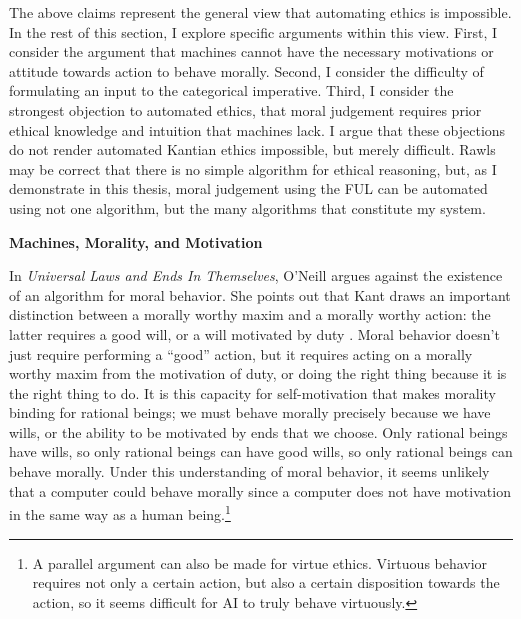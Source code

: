 \begin{isabellebody}
\begin{isamarkuptext}
The above claims represent the general view that automating ethics is impossible. In the
rest of this section, I explore specific arguments within this view. First, I consider the argument 
that machines cannot have the necessary motivations or attitude towards action to behave morally. Second, 
I consider the difficulty of formulating
an input to the categorical imperative. Third, I consider the strongest objection to automated ethics, 
that moral judgement requires prior ethical knowledge and intuition that machines lack. I argue that 
these objections do not render automated Kantian ethics impossible, but merely difficult. Rawls may be 
correct that there is no simple algorithm for ethical reasoning, but, as
I demonstrate in this thesis, moral judgement using the FUL can be automated using not one
algorithm, but the many algorithms that constitute my system.

\medskip

\noindent \textbf{Machines, Morality, and Motivation}

\medskip

In \emph{Universal Laws and Ends In Themselves}, O'Neill argues against the existence of an algorithm for
moral behavior. She points out that Kant draws an important distinction between a morally worthy maxim
and a morally worthy action: the latter requires a good will, or a will motivated by duty \citep[345]{oneilluniversallaws}. 
Moral behavior doesn't just require performing
a ``good'' action, but it requires acting on a morally worthy maxim from the motivation of duty, or 
doing the right thing because it is the right thing to do. It is this capacity 
for self-motivation that makes morality binding for rational beings; we must behave morally precisely 
because we have wills, or the ability to be motivated by ends
that we choose. Only rational beings have wills, so only rational beings can have good wills, so only 
rational beings can behave morally. Under this understanding
of moral behavior, it seems unlikely that a computer could behave morally
since a computer does not have motivation in the same way as a human being.\footnote{A parallel argument can also be made for virtue ethics. Virtuous
behavior requires not only a certain action, but also a certain disposition towards the action, so it seems
difficult for AI to truly behave virtuously.}


\end{isamarkuptext}
\end{isabellebody}
